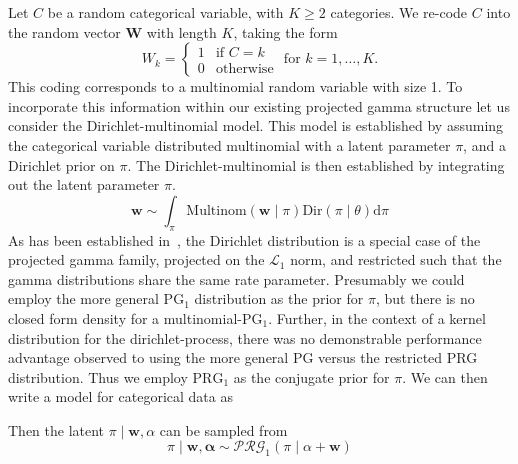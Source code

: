 Let $C$ be a random categorical variable, with $K \geq 2$ categories.  We 
    re-code $C$ into the random vector $\bm{W}$ with length $K$, taking the form
    \begin{equation*}
        W_k = \begin{cases}
            1 &\text{if }C = k\\
            0 &\text{otherwise}
            \end{cases} \text{ for }k = 1,\ldots, K.
    \end{equation*}
    This coding corresponds to a multinomial random variable with size 1. To 
    incorporate this information within our existing projected gamma structure
    let us consider the Dirichlet-multinomial model.  This model is established by
    assuming the categorical variable distributed multinomial with a latent 
    parameter $\pi$, and a Dirichlet prior on $\pi$. The Dirichlet-multinomial is 
    then established by integrating out the latent parameter $\pi$. 
    \begin{equation*}
    \bm{w} \sim \int_{\pi} \text{Multinom}(\bm{w}\mid\pi)\text{Dir}(\pi\mid\theta)\text{d}\pi
    \end{equation*}
    As has been established in~\cite{trubey:pg}, the Dirichlet distribution is a 
    special case of the projected gamma family, projected on the $\mathcal{L}_1$ 
    norm, and restricted such that the gamma distributions share the same rate
    parameter. Presumably we could employ the more general $\text{PG}_1$ distribution
    as the prior for $\pi$, but there is no closed form density for a 
    multinomial-$\text{PG}_1$.  Further, in the context of a kernel distribution
    for the dirichlet-process, there was no demonstrable performance advantage 
    observed to using the more general PG versus the restricted PRG distribution.
    Thus we employ $\text{PRG}_1$ as the conjugate prior for $\pi$. We can then 
    write a model for categorical data as 
    
    Then the latent $\pi\mid \bm{w},\alpha$ can be sampled from
    \begin{equation}
        \label{eq:pi_fullcond}
        \pi \mid \bm{w},\bm{\alpha} \sim \mathcal{PRG}_1(\pi\mid\alpha + \bm{w})
    \end{equation}

